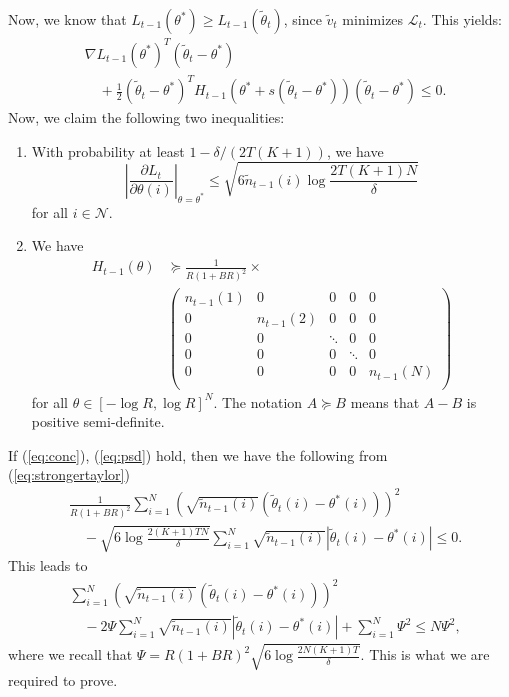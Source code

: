 \documentclass{article}
\theoremstyle{definition}
\newcommand{\NNN}{\mathcal{N}}
\begin{document}
Now, we know that $L_{t-1}(\theta^*)\geq L_{t-1}(\tilde{\theta}_t)$, since $\tilde{v}_t$ minimizes $\mathcal{L}_t$. This  yields:
\begin{align}\label{eq:strongertaylor}
&\nabla L_{t-1}(\theta^*)^T(\tilde{\theta}_t - \theta^*) \nonumber\\
&\quad + \frac{1}{2}(\tilde{\theta}_t - \theta^*)^T H_{t-1}(\theta^* + s(\tilde{\theta}_t - \theta^*))(\tilde{\theta}_t - \theta^*) \leq 0.
\end{align}
Now, we claim the following two inequalities:
\begin{enumerate}
\item With probability at least $1-\delta/(2T(K+1))$, we have
\begin{equation}\label{eq:conc}
\left|\frac{\partial L_t}{\partial \theta(i)}\right|_{\theta = \theta^*} \leq \sqrt{6 \tilde{n}_{t-1}(i)\log\frac{2T(K+1)N}{\delta}}
\end{equation}
for all $i\in \NNN$.
\item We have 
\begin{align}\label{eq:psd}
H_{t-1}(\theta)&\succeq \frac{1}{R(1 + B R)^2}\times \nonumber\\
&\left( \begin{array}{ccccc}
n_{t-1}(1) & 0 & 0 & 0 & 0 \\
0 & n_{t-1}(2) & 0 & 0 & 0 \\
0 & 0 & \ddots &0 & 0 \\
0 &  0 & 0 & \ddots & 0 \\
0 & 0 & 0 & 0 & n_{t-1}(N) \\
\end{array} \right)
\end{align}
for all $\theta\in [-\log R, \log R]^N$. The notation $A\succeq B$ means that $A-B$ is positive semi-definite. 
\end{enumerate}
If (\ref{eq:conc}), (\ref{eq:psd}) hold, then we have the following from (\ref{eq:strongertaylor})
\begin{align*}
&\frac{1}{R(1 + B R)^2}\sum^N_{i=1}\left(\sqrt{\tilde{n}_{t-1}(i)}(\tilde{\theta}_t(i) - \theta^*(i))\right)^2 \nonumber\\ 
&\quad - \sqrt{6\log{\frac{2(K+1)TN}{\delta}}}\sum^N_{i=1} \sqrt{\tilde{n}_{t-1}(i)}\left|\tilde{\theta}_t(i) - \theta^*(i)\right| \leq 0.
\end{align*}
This leads to 
\begin{align*}
&\sum^N_{i=1}\left(\sqrt{\tilde{n}_{t-1}(i)}(\tilde{\theta}_t(i) - \theta^*(i))\right)^2 \nonumber\\
&\quad - 2\Psi\sum^N_{i=1} \sqrt{\tilde{n}_{t-1}(i)}\left|\tilde{\theta}_t(i) - \theta^*(i)\right| + \sum^{N}_{i=1}\Psi^2\leq N \Psi^2, 
\end{align*}
where we recall that $\Psi = R(1 + B R)^2\sqrt{6\log{\frac{2N(K+1)T}{\delta}}}$. This is what we are required to prove. 
\end{document}

